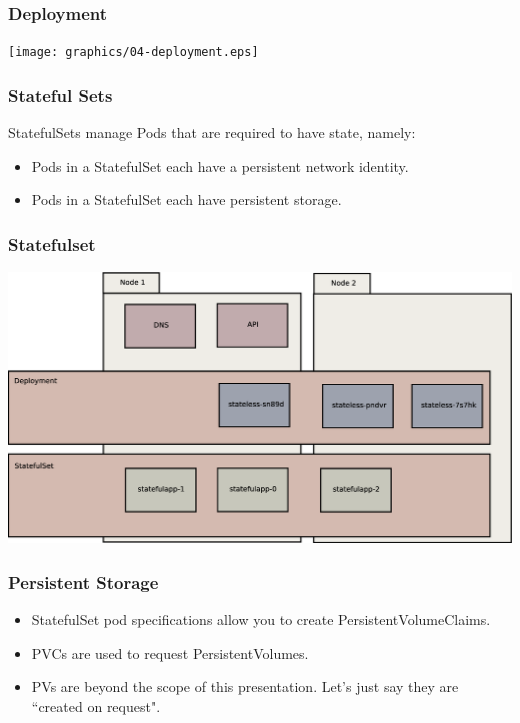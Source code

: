 \documentclass{beamer}
\begin{document}
\begin{frame}
    \frametitle{Deployment}
    \texttt{[image: graphics/04-deployment.eps]}
\end{frame}

\begin{frame}
    \frametitle{Stateful Sets}
    StatefulSets manage Pods that are required to have state, namely:
    \begin{itemize}
        \item Pods in a StatefulSet each have a persistent network identity.
        \item Pods in a StatefulSet each have persistent storage.
    \end{itemize}
\end{frame}

\begin{frame}
    \frametitle{Statefulset}
    \includegraphics[width=\textwidth,height=0.85\textheight,keepaspectratio]{graphics/05-statefulSet.eps}
\end{frame}

\begin{frame}
    \frametitle{Persistent Storage}
    \begin{itemize}
        \item StatefulSet pod specifications allow you to create PersistentVolumeClaims.
        \item PVCs are used to request PersistentVolumes.
        \item PVs are beyond the scope of this presentation. Let's just say they are ``created on request".
    \end{itemize}
\end{frame}
\end{document}
